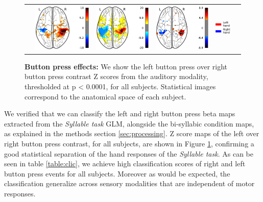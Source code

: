 \begin{figure}[hb]
\begin{tabular}{cccccl}
\hspace{1ex}
&{\includegraphics[width=.14\linewidth]{figures/part_II/press_aud_04.pdf}}
\hspace{1ex}
&{\includegraphics[width=.14\linewidth]{figures/part_II/press_aud_05.pdf}}
\hspace{1ex}
&{\includegraphics[width=.14\linewidth]{figures/part_II/press_aud_06.pdf}}
\hspace{1ex}
&{\includegraphics[width=.10\linewidth]{figures/part_II/press_legend.pdf}} \\
\end{tabular}
\vspace{3ex}
\caption{\textbf{Button press effects:} We show the left button press over right button press contrast Z scores from the auditory modality, thresholded at p < 0.0001, for all subjects. Statistical images correspond to the anatomical space of each subject.}
\label{fig:button_press}
\end{figure}


We verified that we can classify the left and right button press beta maps extracted from the \emph{Syllable task} GLM, alongside the bi-syllabic condition maps, as explained in the methods section \ref{sec:processing}.
Z score maps of the left over right button press contrast, for all subjects, are shown in Figure \ref{fig:button_press}, confirming a good statistical separation of the hand responses of the \emph{Syllable task}.
As can be seen in table \ref{table:clic}, we achieve high classification scores of right and left button press events for all subjects.
Moreover as would be expected, the classification generalize across sensory modalities that are independent of motor responses.


